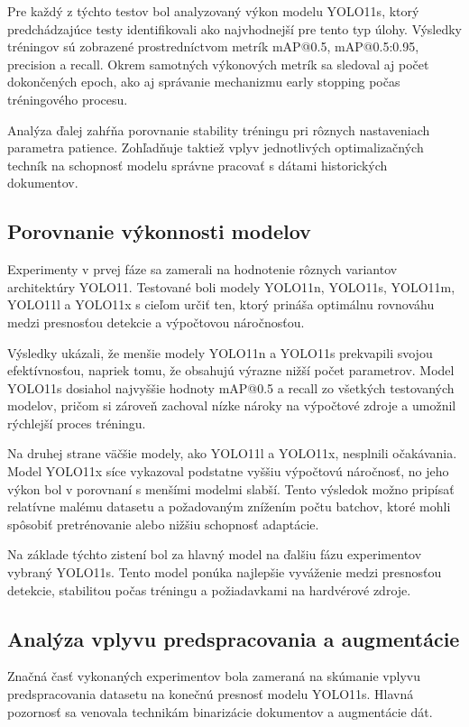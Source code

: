     Pre každý z týchto testov bol analyzovaný výkon modelu YOLO11s, ktorý predchádzajúce testy identifikovali ako najvhodnejší pre tento typ úlohy. Výsledky tréningov sú zobrazené prostredníctvom metrík mAP@0.5, mAP@0.5:0.95, precision a recall. Okrem samotných výkonových metrík sa sledoval aj počet dokončených epoch, ako aj správanie mechanizmu early stopping počas tréningového procesu.

    Analýza ďalej zahŕňa porovnanie stability tréningu pri rôznych nastaveniach parametra patience. Zohľadňuje taktiež vplyv jednotlivých optimalizačných techník na schopnosť modelu správne pracovať s dátami historických dokumentov.
    
    \subsection{Porovnanie výkonnosti modelov}

    Experimenty v prvej fáze sa zamerali na hodnotenie rôznych variantov architektúry YOLO11. Testované boli modely YOLO11n, YOLO11s, YOLO11m, YOLO11l a YOLO11x s cieľom určiť ten, ktorý prináša optimálnu rovnováhu medzi presnosťou detekcie a výpočtovou náročnosťou.

    Výsledky ukázali, že menšie modely YOLO11n a YOLO11s prekvapili svojou efektívnosťou, napriek tomu, že obsahujú výrazne nižší počet parametrov. Model YOLO11s dosiahol najvyššie hodnoty mAP@0.5 a recall zo všetkých testovaných modelov, pričom si zároveň zachoval nízke nároky na výpočtové zdroje a umožnil rýchlejší proces tréningu.

    Na druhej strane väčšie modely, ako YOLO11l a YOLO11x, nesplnili očakávania. Model YOLO11x síce vykazoval podstatne vyššiu výpočtovú náročnosť, no jeho výkon bol v porovnaní s menšími modelmi slabší. Tento výsledok možno pripísať relatívne malému datasetu a požadovaným znížením počtu batchov, ktoré mohli spôsobiť pretrénovanie alebo nižšiu schopnosť adaptácie.

    Na základe týchto zistení bol za hlavný model na ďalšiu fázu experimentov vybraný YOLO11s. Tento model ponúka najlepšie vyváženie medzi presnosťou detekcie, stabilitou počas tréningu a požiadavkami na hardvérové zdroje.

    \subsection{Analýza vplyvu predspracovania a augmentácie}

    Značná časť vykonaných experimentov bola zameraná na skúmanie vplyvu predspracovania datasetu na konečnú presnosť modelu YOLO11s. Hlavná pozornosť sa venovala technikám binarizácie dokumentov a augmentácie dát.

